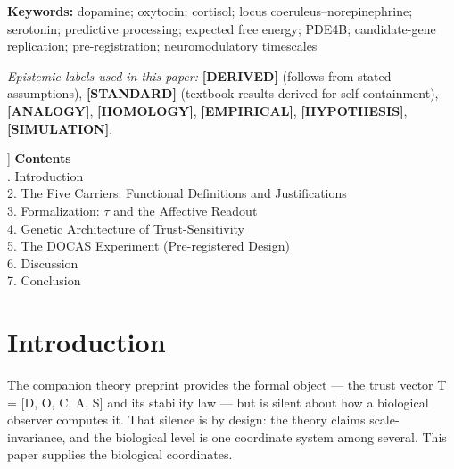 \documentclass[11pt,twocolumn]{article}
\theoremstyle{plain}
\begin{document}
{\begin{abstract}
specified as the stack's decisive test of pipeline decodability and channel-signature separability (the carrier mapping itself is gated by pharmacological/PET-level perturbation, which the protocol's wearable streams cannot deliver). All in-silico evidence reported here is instrument-level: no neurochemistry was measured anywhere in this paper. All computational evidence presented herein validates the instrument pipeline and theoretical master law across in-silico decoding, multi-species connectomics, and optogenetic state-space control; human in-vivo pharmacological validation (DOCAS-GATE-1) is fully pre-registered and pending clinical trial execution.
\end{abstract}
\medskip
\noindent\textbf{Keywords:} dopamine; oxytocin; cortisol; locus coeruleus–norepinephrine; serotonin; predictive processing; expected free energy; PDE4B; candidate-gene replication; pre-registration; neuromodulatory timescales
\par\medskip
{\footnotesize \textit{Epistemic labels used in this paper:} \textbf{[DERIVED]} (follows from stated assumptions), \textbf{[STANDARD]} (textbook results derived for self-containment), \textbf{[ANALOGY]}, \textbf{[HOMOLOGY]}, \textbf{[EMPIRICAL]}, \textbf{[HYPOTHESIS]}, \textbf{[SIMULATION]}.\par}
\bigskip\bigskip
}]
\medskip
\noindent\textbf{Contents}\\[3pt]
{\small{}. Introduction\\
2. The Five Carriers: Functional Definitions and Justifications\\
3. Formalization: $\tau$ and the Affective Readout\\
4. Genetic Architecture of Trust-Sensitivity\\
5. The DOCAS Experiment (Pre-registered Design)\\
6. Discussion\\
7. Conclusion\\
}
\medskip



\FloatBarrier
\section{Introduction}

The companion theory preprint provides the formal object — the trust vector T = [D, O, C, A, S] and its stability law — but is silent about how a biological observer computes it. That silence is by design: the theory claims scale-invariance, and the biological level is one coordinate system among several. This paper supplies the biological coordinates.
\end{document}
